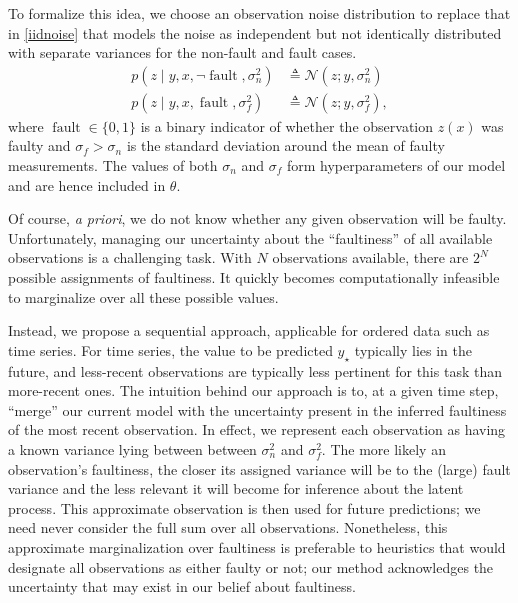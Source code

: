 \documentclass{article}
\newcommand{\deq}{\ensuremath{\triangleq}}
\newcommand{\given}{\ensuremath{\mid}}
\newcommand{\cm}[1]{\ensuremath{\mathcal{#1}}}
\newcommand{\st}{_{\star}}
\DeclareMathOperator{\fault}{fault}
\begin{document}
To formalize this idea, we choose an observation noise distribution to
replace that in \eqref{iidnoise} that models the noise as independent
but not identically distributed with separate variances for the
non-fault and fault cases.
\begin{align*}
 p(z \given y, x, \neg\fault, \sigma_n^2)
 &
 \deq
 \cm{N}(z; y, \sigma_n^2)
 \\
 p(z \given y, x, \fault, \sigma_f^2)
 &
 \deq
 \cm{N}(z; y, \sigma_f^2),
\end{align*}
where $\fault \in \lbrace 0, 1 \rbrace$ is a binary indicator of
whether the observation $z(x)$ was faulty and $\sigma_f > \sigma_n$ is
the standard deviation around the mean of faulty measurements.  The
values of both $\sigma_n$ and $\sigma_f$ form hyperparameters of our
model and are hence included in $\theta$.

Of course, {\it a priori}, we do not know whether any given
observation will be faulty.  Unfortunately, managing our uncertainty
about the ``faultiness'' of all available observations is a
challenging task. With $N$ observations available, there are $2^N$
possible assignments of faultiness. It quickly becomes computationally
infeasible to marginalize over all these possible values.

Instead, we propose a sequential approach, applicable for ordered data
such as time series. For time series, the value to be predicted $y\st$
typically lies in the future, and less-recent observations are
typically less pertinent for this task than more-recent ones. The
intuition behind our approach is to, at a given time step, ``merge''
our current model with the uncertainty present in the inferred
faultiness of the most recent observation. In effect, we represent
each observation as having a known variance lying between between
$\sigma_n^2$ and $\sigma_f^2$. The more likely an observation's
faultiness, the closer its assigned variance will be to the (large)
fault variance and the less relevant it will become for inference
about the latent process. This approximate observation is then used
for future predictions; we need never consider the full sum over all
observations. Nonetheless, this approximate marginalization over
faultiness is preferable to heuristics that would designate all
observations as either faulty or not; our method acknowledges the
uncertainty that may exist in our belief about faultiness.
\end{document}
